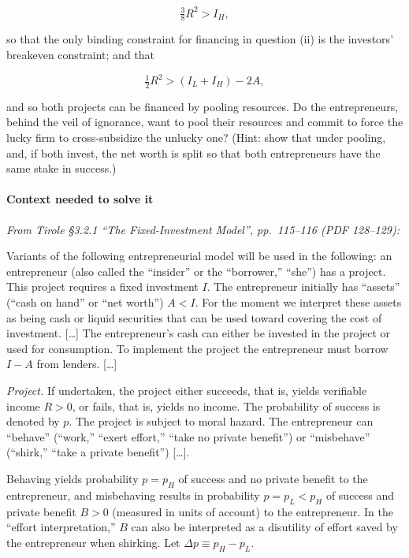 \documentclass[11pt,a4paper]{article}
\begin{document}
\[\tfrac{3}{8}R^2 > I_H,\]

so that the only binding constraint for financing in question (ii) is the investors' breakeven
constraint; and that

\[\tfrac{1}{2}R^2 > (I_L + I_H) - 2A,\]

and so both projects can be financed by pooling resources. Do the entrepreneurs, behind the veil of
ignorance, want to pool their resources and commit to force the lucky firm to cross-subsidize the
unlucky one? (Hint: show that under pooling, and, if both invest, the net worth is split so that
both entrepreneurs have the same stake in success.)

\paragraph{Context needed to solve it}

\emph{From Tirole §3.2.1 ``The Fixed-Investment Model'', pp.~115--116 (PDF 128--129):}

Variants of the following entrepreneurial model will be used in the following: an entrepreneur (also
called the ``insider'' or the ``borrower,'' ``she'') has a project. This project requires a fixed
investment \(I\). The entrepreneur initially has ``assets'' (``cash on hand'' or ``net worth'')
\(A < I\). For the moment we interpret these assets as being cash or liquid securities that can be
used toward covering the cost of investment. {[}\ldots{]} The entrepreneur's cash can either be
invested in the project or used for consumption. To implement the project the entrepreneur must
borrow \(I - A\) from lenders. {[}\ldots{]}

\emph{Project.} If undertaken, the project either succeeds, that is, yields verifiable income
\(R > 0\), or fails, that is, yields no income. The probability of success is denoted by \(p\). The
project is subject to moral hazard. The entrepreneur can ``behave'' (``work,'' ``exert effort,''
``take no private benefit'') or ``misbehave'' (``shirk,'' ``take a private benefit'') {[}\ldots{]}.

Behaving yields probability \(p = p_H\) of success and no private benefit to the entrepreneur, and
misbehaving results in probability \(p = p_L < p_H\) of success and private benefit \(B > 0\)
(measured in units of account) to the entrepreneur. In the ``effort interpretation,'' \(B\) can also
be interpreted as a disutility of effort saved by the entrepreneur when shirking. Let
\(\Delta p \equiv p_H - p_L\).
\end{document}
